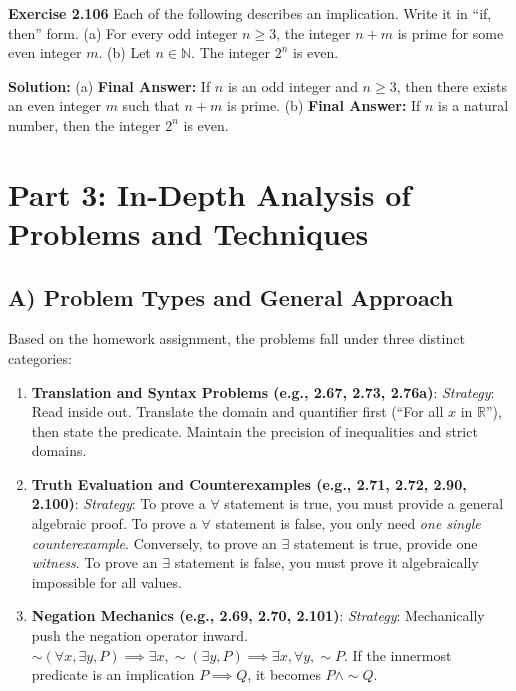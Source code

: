 \documentclass[12pt]{article}
\begin{document}
\textbf{Exercise 2.106}
Each of the following describes an implication. Write it in ``if, then'' form.
(a) For every odd integer $n \ge 3$, the integer $n+m$ is prime for some even integer $m$.
(b) Let $n \in \mathbb{N}$. The integer $2^n$ is even.
\begin{mdframed}
\textbf{Solution:}
(a) \textbf{Final Answer:} If $n$ is an odd integer and $n \ge 3$, then there exists an even integer $m$ such that $n+m$ is prime.
(b) \textbf{Final Answer:} If $n$ is a natural number, then the integer $2^n$ is even.
\end{mdframed}

\newpage
\section{Part 3: In-Depth Analysis of Problems and Techniques}

\subsection{A) Problem Types and General Approach}
Based on the homework assignment, the problems fall under three distinct categories:
\begin{enumerate}
    \item \textbf{Translation and Syntax Problems (e.g., 2.67, 2.73, 2.76a)}:
    \textit{Strategy}: Read inside out. Translate the domain and quantifier first (``For all $x$ in $\mathbb{R}$''), then state the predicate. Maintain the precision of inequalities and strict domains.
    \item \textbf{Truth Evaluation and Counterexamples (e.g., 2.71, 2.72, 2.90, 2.100)}:
    \textit{Strategy}: To prove a $\forall$ statement is true, you must provide a general algebraic proof. To prove a $\forall$ statement is false, you only need \textit{one single counterexample}. Conversely, to prove an $\exists$ statement is true, provide one \textit{witness}. To prove an $\exists$ statement is false, you must prove it algebraically impossible for all values.
    \item \textbf{Negation Mechanics (e.g., 2.69, 2.70, 2.101)}:
    \textit{Strategy}: Mechanically push the negation operator inward. $\sim(\forall x, \exists y, P) \implies \exists x, \sim(\exists y, P) \implies \exists x, \forall y, \sim P$. If the innermost predicate is an implication $P \implies Q$, it becomes $P \land \sim Q$.
\end{enumerate}
\end{document}
